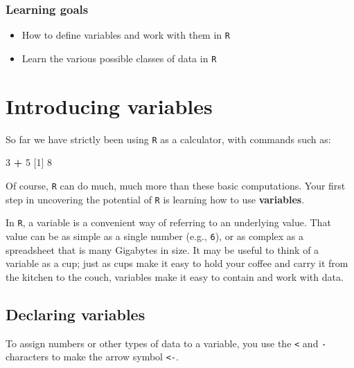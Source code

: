 \documentclass[
]{book}
\newenvironment{Shaded}{\begin{snugshade}}{\end{snugshade}}
\newcommand{\DecValTok}[1]{\textcolor[rgb]{0.00,0.00,0.81}{#1}}
\newcommand{\NormalTok}[1]{#1}
\newcommand{\SpecialCharTok}[1]{\textcolor[rgb]{0.81,0.36,0.00}{\textbf{#1}}}
\providecommand{\tightlist}{%
  \setlength{\itemsep}{0pt}\setlength{\parskip}{0pt}}
\begin{document}
\subsubsection*{Learning goals}\label{learning-goals-3}

\begin{itemize}
\tightlist
\item
  How to define variables and work with them in \texttt{R}\\
\item
  Learn the various possible classes of data in \texttt{R}
\end{itemize}

\section*{Introducing variables}\label{introducing-variables}

So far we have strictly been using \texttt{R} as a calculator, with commands such as:

\begin{Shaded}
\begin{Highlighting}[]
\DecValTok{3} \SpecialCharTok{+} \DecValTok{5}
\NormalTok{[}\DecValTok{1}\NormalTok{] }\DecValTok{8}
\end{Highlighting}
\end{Shaded}

Of course, \texttt{R} can do much, much more than these basic computations. Your first step in uncovering the potential of \texttt{R} is learning how to use \textbf{variables}.

In \texttt{R}, a variable is a convenient way of referring to an underlying value. That value can be as simple as a single number (e.g., \texttt{6}), or as complex as a spreadsheet that is many Gigabytes in size. It may be useful to think of a variable as a cup; just as cups make it easy to hold your coffee and carry it from the kitchen to the couch, variables make it easy to contain and work with data.

\subsection*{Declaring variables}\label{declaring-variables}

To assign numbers or other types of data to a variable, you use the \texttt{\textless{}} and \texttt{-} characters to make the arrow symbol \texttt{\textless{}-}.
\end{document}
